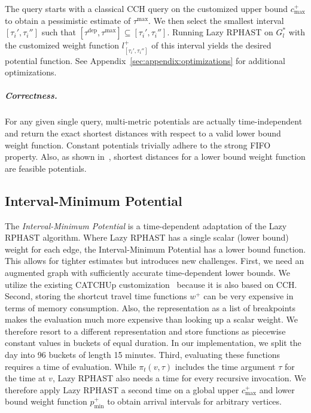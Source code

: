 \documentclass[a4paper,UKenglish,cleveref, autoref, thm-restate,anonymous]{lipics-v2021}
\newcommand*{\pred}{p}
\newcommand*{\comb}{c}
\newcommand*{\tdep}{\tau^{\operatorname{dep}}}
\newcommand*{\tmax}{\tau^{\max}}
\begin{document}
The query starts with a classical CCH query on the customized upper bound $\comb^+_{\max}$ to obtain a pessimistic estimate of $\tmax$.
We then select the smallest interval $[\tau_i', \tau_i'']$ such that $[\tdep,\tmax] \subseteq [\tau_i', \tau_i'']$.
Running Lazy RPHAST on $G^*_l$ with the customized weight function $l_{[\tau_i', \tau_i'']}^+$ of this interval yields the desired potential function.
See Appendix~\ref{sec:appendix:optimizations} for additional optimizations.

\subparagraph{Correctness.}
For any given single query, multi-metric potentials are actually time-independent and return the exact shortest distances with respect to a valid lower bound weight function.
Constant potentials trivially adhere to the strong FIFO property.
Also, as shown in~\cite{strasser_et_al:LIPIcs.SEA.2021.6}, shortest distances for a lower bound weight function are feasible potentials.

\subsection{Interval-Minimum Potential}

The \emph{Interval-Minimum Potential} is a time-dependent adaptation of the Lazy RPHAST algorithm.
Where Lazy RPHAST has a single scalar (lower bound) weight for each edge, the Interval-Minimum Potential has a lower bound function.
This allows for tighter estimates but introduces new challenges.
First, we need an augmented graph with sufficiently accurate time-dependent lower bounds.
We utilize the existing CATCHUp customization~\cite{swz-sfert-21} because it is also based on CCH.
Second, storing the shortcut travel time functions $w^+$ can be very expensive in terms of memory consumption.
Also, the representation as a list of breakpoints makes the evaluation much more expensive than looking up a scalar weight.
We therefore resort to a different representation and store functions as piecewise constant values in buckets of equal duration.
In our implementation, we split the day into 96 buckets of length 15 minutes.
Third, evaluating these functions requires a time of evaluation.
While $\pi_t(v, \tau)$ includes the time argument $\tau$ for the time at $v$, Lazy RPHAST also needs a time for every recursive invocation.
We therefore apply Lazy RPHAST a second time on a global upper $\comb_{\max}^+$ and lower bound weight function $\pred_{\min}^+$ to obtain arrival intervals for arbitrary vertices.
\end{document}
